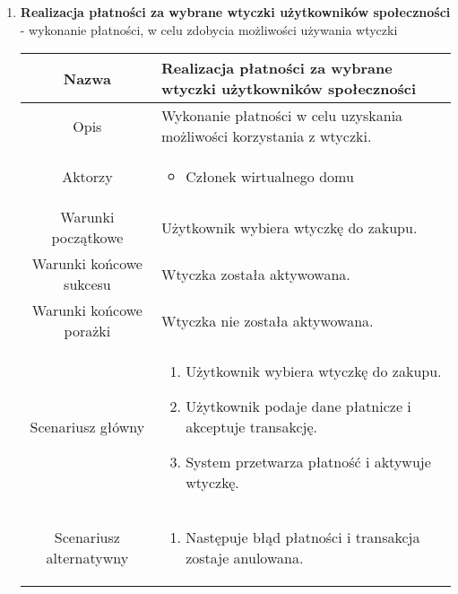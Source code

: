 \documentclass{article}
\begin{document}
\begin{enumerate}
\begin{enumerate}
			\item \textbf{Realizacja płatności za wybrane wtyczki użytkowników
				społeczności} - wykonanie płatności, w celu zdobycia możliwości używania
				wtyczki
				\begin{table}[H]
					\centering
					\begin{tabular}{|c|p{7cm}|}
						\hline
						Nazwa                   & \textbf{Realizacja płatności za wybrane wtyczki użytkowników społeczności}                                                                                                                        \\
						\hline
						Opis                    & Wykonanie płatności w celu uzyskania możliwości korzystania z wtyczki.                                                                                                                            \\
						\hline
						Aktorzy                 & \begin{itemize}\item Członek wirtualnego domu\end{itemize}                                                                                                                                        \\
						\hline
						Warunki początkowe      & Użytkownik wybiera wtyczkę do zakupu.                                                                                                                                                             \\
						\hline
						Warunki końcowe sukcesu & Wtyczka została aktywowana.                                                                                                                                                                       \\
						\hline
						Warunki końcowe porażki & Wtyczka nie została aktywowana.                                                                                                                                                                   \\
						\hline
						Scenariusz główny       & \begin{enumerate}\item Użytkownik wybiera wtyczkę do zakupu.

\item Użytkownik podaje dane płatnicze i akceptuje transakcję.

\item System przetwarza płatność i aktywuje wtyczkę.\end{enumerate} \\
						\hline
						Scenariusz alternatywny & \begin{enumerate}\item Następuje błąd płatności i transakcja zostaje anulowana.


\end{enumerate}
\end{tabular}
\end{table}
\end{enumerate}
\end{enumerate}
\end{document}
